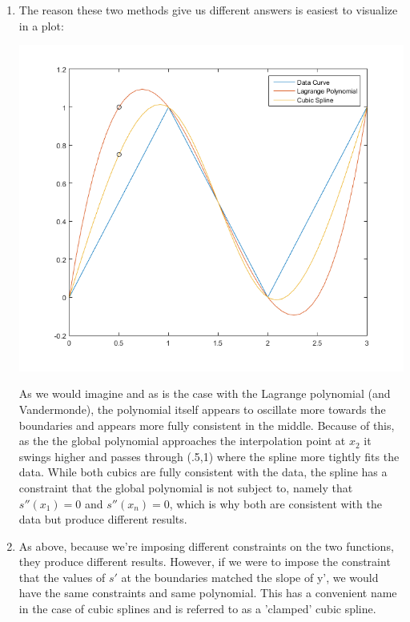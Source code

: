 \documentclass[11pt,a4paper]{article}
\begin{document}
\begin{itemize}
\begin{enumerate} [label={\alph*)}]
				Plugging all of these values back into $s(x)$ we get:
				$$s(.5) = -\frac{5}{3}*0.0208 + 0*0.4792 + \frac{5}{3}*0.4792 + -\frac{2}{3}*0.0208 + 1*0 + \frac{8}{3}*0$$
				$$s(.5) = .7500 $$
				\item The reason these two methods give us different answers is easiest to visualize in a plot:
					\begin{center}
						\includegraphics[width=1\linewidth]{ch5q26}
					\end{center}
					As we would imagine and as is the case with the Lagrange polynomial (and Vandermonde), the polynomial itself appears to oscillate more towards the boundaries and appears more fully consistent in the middle. Because of this, as the the global polynomial approaches the interpolation point at $x_2$ it swings higher and passes through (.5,1) where the spline more tightly fits the data. While both cubics are fully consistent with the data, the spline has a constraint that the global polynomial is not subject to, namely that $s''(x_1) = 0$ and $s''(x_n) = 0$, which is why both are consistent with the data but produce different results.
					\item As above, because we're imposing different constraints on the two functions, they produce different results. However, if we were to impose the constraint that the values of $s'$ at the boundaries matched the slope of y', we would have the same constraints and same polynomial. This has a convenient name in the case of cubic splines and is referred to as a 'clamped' cubic spline.
				\end{enumerate}
				

\end{itemize}
\end{document}
